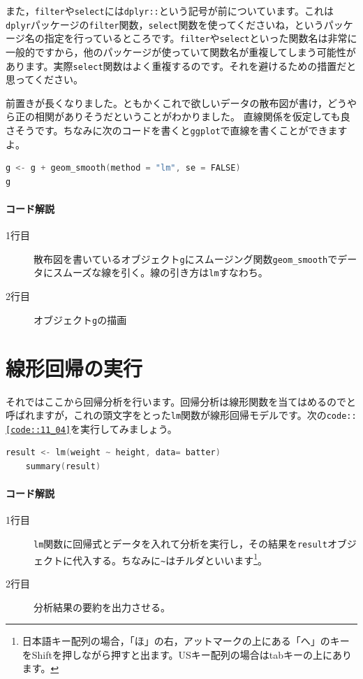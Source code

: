 \documentclass{ltjbook}
\begin{document}
また，\texttt{filter}や\texttt{select}には\texttt{dplyr::}という記号が前についています。これは\texttt{dplyr}パッケージの\texttt{filter}関数，\texttt{select}関数を使ってくださいね，というパッケージ名の指定を行っているところです。\texttt{filter}や\texttt{select}といった関数名は非常に一般的ですから，他のパッケージが使っていて関数名が重複してしまう可能性があります。実際\texttt{select}関数はよく重複するのです。それを避けるための措置だと思ってください。

前置きが長くなりました。ともかくこれで欲しいデータの散布図が書け，どうやら正の相関がありそうだということがわかりました。
直線関係を仮定しても良さそうです。ちなみに次のコードを書くと\texttt{ggplot}で直線を書くことができますよ。

\begin{lstlisting}[language=c++,label={code::11_03},caption={回帰線を引く}]
g <- g + geom_smooth(method = "lm", se = FALSE)
g
\end{lstlisting}
\paragraph{コード解説}
\begin{description}
    \item[1行目] 散布図を書いているオブジェクト\texttt{g}にスムージング関数\verb|geom_smooth|でデータにスムーズな線を引く。線の引き方は\texttt{lm}すなわち。
    \item[2行目] オブジェクト\texttt{g}の描画
\end{description}

\section{線形回帰の実行}
それではここから回帰分析を行います。回帰分析は線形関数を当てはめるのでと呼ばれますが，これの頭文字をとった\texttt{lm}関数が線形回帰モデルです。次の\texttt{code::\ref{code::11_04}}を実行してみましょう。
\begin{lstlisting}[language=c++,label={code::11_04},caption={回帰分析の実行}]
    result <- lm(weight ~ height, data= batter)
    summary(result)
\end{lstlisting}

\paragraph{コード解説}
\begin{description}
    \item[1行目] \texttt{lm}関数に回帰式とデータを入れて分析を実行し，その結果を\texttt{result}オブジェクトに代入する。ちなみに\verb|~|はチルダといいます\footnote{日本語キー配列の場合，「ほ」の右，アットマークの上にある「へ」のキーをShiftを押しながら押すと出ます。USキー配列の場合はtabキーの上にあります。}。
    \item[2行目] 分析結果の要約を出力させる。
\end{description}
\end{document}
